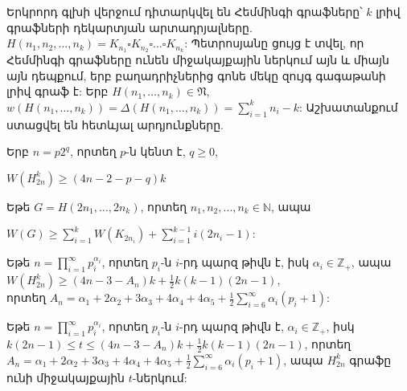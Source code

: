 Երկրորդ գլխի վերջում դիտարկվել են Հեմմինգի գրաֆները՝ $k$ լրիվ գրաֆների դեկարտյան արտադրյալները. 
$ H(n_1,n_2,\ldots,n_k) = K_{n_1} \square K_{n_2} \square \ldots \square K_{n_k} $: Պետրոսյանը ցույց է տվել, որ Հեմմինգի գրաֆները ունեն միջակայքային ներկում այն և միայն այն դեպքում, երբ բաղադրիչներից գոնե մեկը զույգ գագաթանի լրիվ գրաֆ է: Երբ $H(n_1,\ldots,n_k)\in \mathfrak{N}$,
$w(H(n_1,\ldots,n_k))=\Delta(H(n_1,\ldots,n_k))=\sum_{i=1}^k{n_i}-k$: Աշխատանքում ստացվել են հետևյալ արդյունքները.


\begin{hide}
\begin{theorem}\cite{Petrosyan2011} 
\label{t2_Hamming_balanced_lower_old} Երբ $n=p2^q$, որտեղ $p$-ն կենտ է, $q\geq0$,
\begin{center}
$W(H_{2n}^k) \geq (4n-2-p-q)k$
\end{center}
\end{theorem}
\end{hide}

\begin{theorem}
\label{t2_Hamming_balanced_lower} Եթե $G = H(2n_1,\ldots,2n_k)$, որտեղ $n_1, n_2, \ldots, n_k \in \mathbb{N}$, ապա
\begin{center}
$W(G) \geq \sum_{i=1}^k{W(K_{2n_i})}+\sum_{i=1}^{k-1}{i\left(2n_i-1\right)}$:
\end{center}
\end{theorem}

\begin{hide}
\begin{corollary}
\label{c2_Hamming_balanced_lower} Եթե $n = \prod\limits_{i=1}^{\infty}{p_i^{\alpha_i}}$, որտեղ $p_i$-ն $i$-րդ պարզ թիվն է, իսկ $\alpha_i \in \mathbb{Z}_+$, ապա 
$W(H_{2n}^k) \geq (4n - 3 - A_n)k + \frac{1}{2}k(k-1)(2n-1)$,\\
որտեղ $A_n = \alpha_1 + 2\alpha_2 + 3\alpha_3 + 4\alpha_4 + 4\alpha_5 + \frac{1}{2}\sum\limits_{i=6}^{\infty}{\alpha_i(p_i+1)} $:
\end{corollary}
\begin{corollary}
Եթե $n = \prod\limits_{i=1}^{\infty}{p_i^{\alpha_i}}$, որտեղ $p_i$-ն $i$-րդ պարզ թիվն է, $\alpha_i \in \mathbb{Z}_+$, իսկ $k(2n-1) \leq t \leq (4n - 3 - A_n)k + \frac{1}{2}k(k-1)(2n-1)$,
որտեղ $A_n = \alpha_1 + 2\alpha_2 + 3\alpha_3 + 4\alpha_4 + 4\alpha_5 + \frac{1}{2}\sum\limits_{i=6}^{\infty}{\alpha_i(p_i+1)}$, ապա $H_{2n}^k$ գրաֆը ունի միջակայքային $t$-ներկում:
\end{corollary}
\end{hide}

